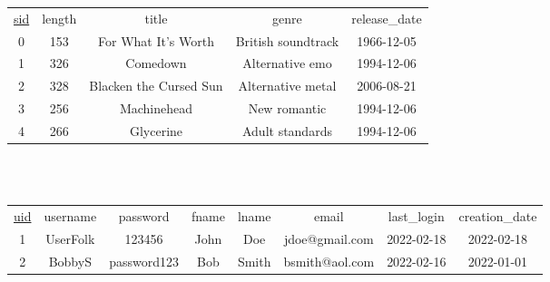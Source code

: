 \documentclass[12pt]{article}
\begin{document}
    \begin{center}
        \begin{tabular}{ |c|c|c|c|c| }
            \hline
            \rowcolor{tablegrey} \multicolumn{5}{|c|}{Song} \\
            \hline
            \underline{sid} & length & title & genre & release\_date \\
            \hline
            0 & 153 & For What It's Worth & British soundtrack & 1966-12-05 \\
            \hline
            1 & 326 & Comedown & Alternative emo & 1994-12-06 \\
            \hline
            2 & 328 & Blacken the Cursed Sun & Alternative metal & 2006-08-21 \\
            \hline
            3 & 256 & Machinehead & New romantic & 1994-12-06 \\
            \hline
            4 & 266 & Glycerine & Adult standards & 1994-12-06 \\
            \hline
        \end{tabular}
    \end{center}

    \\~\\

    \begin{table}
        \scriptsize
        \begin{center}
            \begin{tabular}{ |c|c|c|c|c|c|c|c| }
                \hline
                \rowcolor{tablegrey} \multicolumn{8}{|c|}{User} \\
                \hline
                \underline{uid} & username & password & fname & lname & email & last\_login & creation\_date \\
                \hline
                1 & UserFolk & 123456 & John & Doe & jdoe@gmail.com & 2022-02-18 & 2022-02-18\\
                \hline
                2 & BobbyS & password123 & Bob & Smith & bsmith@aol.com & 2022-02-16 & 2022-01-01 \\
                \hline
            \end{tabular}
        \end{center}
    \end{table}

    \\~\\
\end{document}
